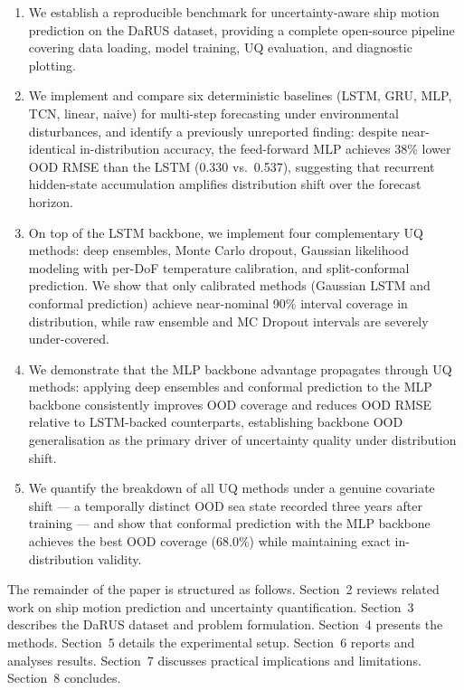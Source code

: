 \documentclass[a4paper,fleqn]{cas-sc}
\begin{document}
\begin{enumerate}
    \item We establish a reproducible benchmark for uncertainty-aware ship motion prediction on the DaRUS dataset, providing a complete open-source pipeline covering data loading, model training, UQ evaluation, and diagnostic plotting.

    \item We implement and compare six deterministic baselines (LSTM, GRU, MLP, TCN, linear, naive) for multi-step forecasting under environmental disturbances, and identify a previously unreported finding: despite near-identical in-distribution accuracy, the feed-forward MLP achieves 38\% lower OOD RMSE than the LSTM (0.330 vs.\ 0.537), suggesting that recurrent hidden-state accumulation amplifies distribution shift over the forecast horizon.

    \item On top of the LSTM backbone, we implement four complementary UQ methods: deep ensembles, Monte Carlo dropout, Gaussian likelihood modeling with per-DoF temperature calibration, and split-conformal prediction. We show that only calibrated methods (Gaussian LSTM and conformal prediction) achieve near-nominal 90\% interval coverage in distribution, while raw ensemble and MC Dropout intervals are severely under-covered.

    \item We demonstrate that the MLP backbone advantage propagates through UQ methods: applying deep ensembles and conformal prediction to the MLP backbone consistently improves OOD coverage and reduces OOD RMSE relative to LSTM-backed counterparts, establishing backbone OOD generalisation as the primary driver of uncertainty quality under distribution shift.

    \item We quantify the breakdown of all UQ methods under a genuine covariate shift — a temporally distinct OOD sea state recorded three years after training — and show that conformal prediction with the MLP backbone achieves the best OOD coverage (68.0\%) while maintaining exact in-distribution validity.
\end{enumerate}

The remainder of the paper is structured as follows. Section~2 reviews related work on ship motion prediction and uncertainty quantification. Section~3 describes the DaRUS dataset and problem formulation. Section~4 presents the methods. Section~5 details the experimental setup. Section~6 reports and analyses results. Section~7 discusses practical implications and limitations. Section~8 concludes.
\end{document}
